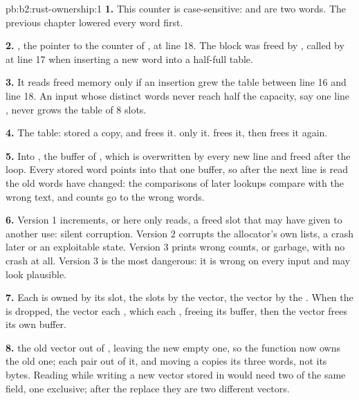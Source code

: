 \begin{solution}{pb:b2:rust-ownership:1}
\textbf{1.} This counter is case-sensitive:  and  are two words. The previous chapter lowered every
word first.

\textbf{2.} , the pointer to the counter of , at line 18. The block was freed by ,
called by  at line 17 when inserting a new word into a half-full table.

\textbf{3.} It reads freed memory only if an insertion grew the table between line 16 and line 18. An input whose
distinct words never reach half the capacity, say one line , never grows the table of 8 slots.

\textbf{4.} The table:  stored a  copy, and  frees it.  only
 it.  frees it, then  frees it again.

\textbf{5.} Into , the buffer of , which is overwritten by every new line and freed after the
loop. Every stored word points into that one buffer, so after the next line is read the old words have changed: the
comparisons of later lookups compare with the wrong text, and counts go to the wrong words.

\textbf{6.} Version 1 increments, or here only reads, a freed slot that  may have given to another
use: silent corruption. Version 2 corrupts the allocator's own lists, a crash later or an exploitable state. Version
3 prints wrong counts, or garbage, with no crash at all. Version 3 is the most dangerous: it is wrong on every input
and may look plausible.

\textbf{7.} Each  is owned by its slot, the slots by the vector, the vector by the . When the
 is dropped, the vector  each , which  each , freeing its buffer, then
the vector frees its own buffer.

\textbf{8.}   the old vector out of , leaving the new empty one, so the
function now owns the old one;   each pair out of it, and moving a  copies its three
words, not its bytes. Reading  while writing a new vector stored in  would need two
 of the same field, one exclusive; after the replace they are two different vectors.


\end{solution}
